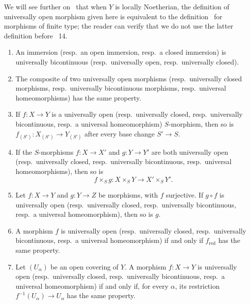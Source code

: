 We will see further on~ that when $Y$ is locally Noetherian, the definition of universally open morphism given here is equivalent to the definition~ for morphisms of finite type; the reader can verify that we do not use the latter definition before \textsection~14.

\begin{proposition}[2.4.3]
\label{IV.2.4.3}
\medskip\noindent
\begin{enumerate}
  \item[(i)] An immersion \textnormal{(}resp.\ an open immersion, resp.\ a closed immersion\textnormal{)} is universally bicontinuous \textnormal{(}resp.\ universally open, resp.\ universally closed\textnormal{)}.
  \item[(ii)] The composite of two universally open morphisms \textnormal{(}resp.\ universally closed morphisms, resp.\ universally bicontinuous morphisms, resp.\ universal homeomorphisms\textnormal{)} has the same property.
  \item[(iii)] If $f:X\to Y$ is a universally open \textnormal{(}resp.\ universally closed, resp.\ universally bicontinuous, resp.\ a universal homeomorphism\textnormal{)} $S$-morphism, then so is $f_{(S')}:X_{(S')}\to Y_{(S')}$ after every base change $S'\to S$.
  \item[(iv)] If the $S$-morphisms $f:X\to X'$ and $g:Y\to Y'$ are both universally open \textnormal{(}resp.\ universally closed, resp.\ universally bicontinuous, resp.\ universal homeomorphisms\textnormal{)}, then so is
  \[
    f\times_S g:X\times_S Y\longrightarrow X'\times_S Y'.
  \]
  \item[(v)] Let $f:X\to Y$ and $g:Y\to Z$ be morphisms, with $f$ surjective. If $g\circ f$ is universally open \textnormal{(}resp.\ universally closed, resp.\ universally bicontinuous, resp.\ a universal homeomorphism\textnormal{)}, then so is $g$.
  \item[(vi)] A morphism $f$ is universally open \textnormal{(}resp.\ universally closed, resp.\ universally bicontinuous, resp.\ a universal homeomorphism\textnormal{)} if and only if $f_{\mathrm{red}}$ has the same property.
  \item[(vii)] Let $(U_\alpha)$ be an open covering of $Y$. A morphism $f:X\to Y$ is universally open \textnormal{(}resp.\ universally closed, resp.\ universally bicontinuous, resp.\ a universal homeomorphism\textnormal{)} if and only if, for every $\alpha$, its restriction $f^{-1}(U_\alpha)\to U_\alpha$ has the same property.
\end{enumerate}
\end{proposition}

